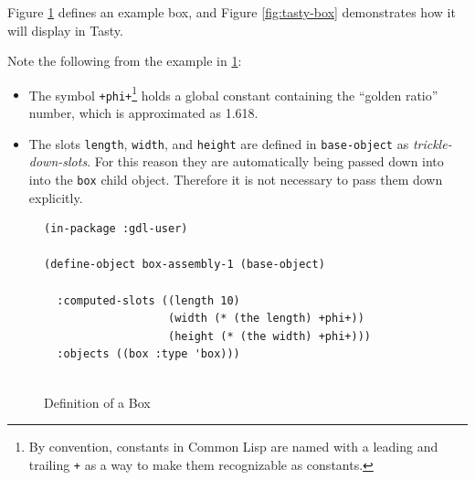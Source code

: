 \documentclass [11pt]{book}
\begin{document}
Figure 
\ref{fig:box-code} defines an example box, and Figure 
\ref{fig:tasty-box} demonstrates how it will display in Tasty.



Note the following from the example in 
\ref{fig:box-code}:

\begin{itemize}

\item The symbol \texttt{+phi+}\footnote{By convention, constants in Common Lisp are
	    named with a leading and trailing \texttt{+} as a way to make them recognizable as constants.} holds a global constant containing the ``golden ratio''
	    number, which is approximated as 1.618.

\item The slots \texttt{length}, \texttt{width}, and \texttt{height}
 are defined in \texttt{base-object} as \emph{trickle-down-slots}. For this reason they are automatically being passed down
into into the \texttt{box} child object. Therefore it is not necessary to pass them down explicitly.
\end{itemize}




\begin{figure}
\begin{lrbox}{\boxedverb}
\begin{minipage}{\linewidth}

\begin{verbatim}(in-package :gdl-user)

(define-object box-assembly-1 (base-object)

  :computed-slots ((length 10)
                   (width (* (the length) +phi+))
                   (height (* (the width) +phi+)))
  :objects ((box :type 'box)))
                 

\end{verbatim}
\end{minipage}
\end{lrbox}
\fbox{\usebox{\boxedverb}}

\caption{Definition of a Box}

\label{fig:box-code}

\end{figure}
\end{document}
